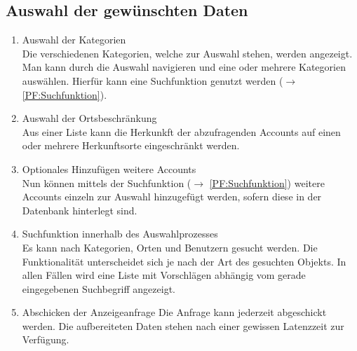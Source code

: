 \subsection{Auswahl der gewünschten Daten}
\begin{enumerate}[ align=left, label={\textbf{\textbackslash F10\arabic*0\textbackslash}} ]
	\item Auswahl der Kategorien \label{PF:KategorienAuswahl}\\ 
	Die verschiedenen Kategorien, welche zur Auswahl stehen, werden angezeigt. Man kann durch die Auswahl navigieren und eine oder mehrere Kategorien auswählen. Hierfür kann eine Suchfunktion genutzt werden ($\rightarrow$ \ref{PF:Suchfunktion}). 
	\item Auswahl der Ortsbeschränkung \label{PF:OrtAuswahl} \\
	Aus einer Liste kann die Herkunkft der abzufragenden Accounts auf einen oder mehrere Herkunftsorte eingeschränkt werden. 
	\item Optionales Hinzufügen weitere Accounts \label{PF:AccountHinzufügen} \\
	Nun können mittels der Suchfunktion ($\rightarrow$ \ref{PF:Suchfunktion}) weitere Accounts einzeln zur Auswahl hinzugefügt werden, sofern diese in der Datenbank hinterlegt sind.
	\item Suchfunktion innerhalb des Auswahlprozesses \label{PF:Suchfunktion} \\
	Es kann nach Kategorien, Orten und Benutzern gesucht werden. Die Funktionalität unterscheidet sich je nach der Art des gesuchten Objekts. In allen Fällen wird eine Liste mit Vorschlägen abhängig vom gerade eingegebenen Suchbegriff angezeigt. 
	\item Abschicken der Anzeigeanfrage \label{PF:Absenden}
	Die Anfrage kann jederzeit abgeschickt werden. Die aufbereiteten Daten stehen nach einer gewissen Latenzzeit zur Verfügung.
\end{enumerate}	
